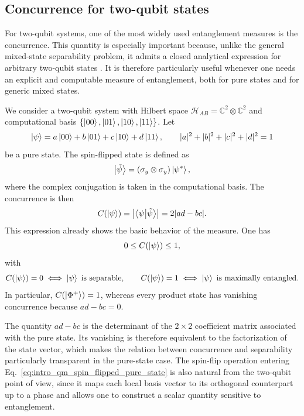 \subsection{Concurrence for two-qubit states}
\label{subsec:concurrence_two_qubits}

For two-qubit systems, one of the most widely used entanglement measures is the concurrence. This quantity is especially important because, unlike the general mixed-state separability problem, it admits a closed analytical expression for arbitrary two-qubit states \cite{Wootters98,NielsenChuang10}. It is therefore particularly useful whenever one needs an explicit and computable measure of entanglement, both for pure states and for generic mixed states.

We consider a two-qubit system with Hilbert space $\mathcal{H}_{AB}=\mathds{C}^2\otimes\mathds{C}^2$ and computational basis $\left\{\ket{00},\ket{01},\ket{10},\ket{11}\right\}$. Let
\begin{equation}
	\ket{\psi}
	=
	a\ket{00}+b\ket{01}+c\ket{10}+d\ket{11},
	\qquad
	|a|^2+|b|^2+|c|^2+|d|^2=1
	\label{eq:intro_qm_generic_two_qubit_pure_state_concurrence}
\end{equation}
be a pure state. The spin-flipped state is defined as
\begin{equation}
	\ket{\tilde{\psi}}
	=
	(\sigma_y\otimes\sigma_y)\ket{\psi^*},
	\label{eq:intro_qm_spin_flipped_pure_state}
\end{equation}
where the complex conjugation is taken in the computational basis. The concurrence is then
\begin{equation}
	C(\ket{\psi})
	=
	\left|\braket{\psi}{\tilde{\psi}}\right|
	=
	2|ad-bc|.
	\label{eq:intro_qm_pure_state_concurrence_explicit}
\end{equation}
This expression already shows the basic behavior of the measure. One has
\begin{equation}
	0\leq C(\ket{\psi})\leq 1,
	\label{eq:intro_qm_concurrence_bounds_pure}
\end{equation}
with
\begin{equation}
	C(\ket{\psi})=0
	\iff
	\ket{\psi}\ \text{is separable},
	\qquad
	C(\ket{\psi})=1
	\iff
	\ket{\psi}\ \text{is maximally entangled}.
	\label{eq:intro_qm_concurrence_pure_extremes}
\end{equation}
In particular, \(C(\ket{\Phi^+})=1\), whereas every product state has vanishing concurrence because \(ad-bc=0\).

The quantity \(ad-bc\) is the determinant of the \(2\times 2\) coefficient matrix associated with the pure state. Its vanishing is therefore equivalent to the factorization of the state vector, which makes the relation between concurrence and separability particularly transparent in the pure-state case. The spin-flip operation entering Eq.~\eqref{eq:intro_qm_spin_flipped_pure_state} is also natural from the two-qubit point of view, since it maps each local basis vector to its orthogonal counterpart up to a phase and allows one to construct a scalar quantity sensitive to entanglement.

